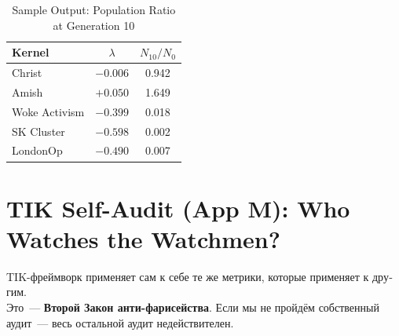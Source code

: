 \documentclass[11pt,a4paper]{article}
\theoremstyle{definition}
\theoremstyle{remark}
\begin{document}
\begin{table}[H]
\centering
\caption{Sample Output: Population Ratio at Generation 10}
\label{tab:code-output}
\begin{tabular}{@{}lcc@{}}
\toprule
\textbf{Kernel} & $\lambda$ & $N_{10}/N_0$ \\
\midrule
Christ        & $-0.006$ & 0.942 \\
Amish         & $+0.050$ & 1.649 \\
Woke Activism & $-0.399$ & 0.018 \\
SK Cluster    & $-0.598$ & 0.002 \\
LondonOp      & $-0.490$ & 0.007 \\
\bottomrule
\end{tabular}
\end{table}

\section{TIK Self-Audit (App M):
  Who Watches the Watchmen?}
\label{app:self-audit}

\begin{manifestobox}
\foreignlanguage{russian}{
TIK-фреймворк применяет сам к себе те же метрики,
которые применяет к другим.\\
Это~--- \textbf{Второй Закон анти-фарисейства}.
Если мы не пройдём собственный аудит~---
весь остальной аудит недействителен.
}
\end{manifestobox}
\end{document}
